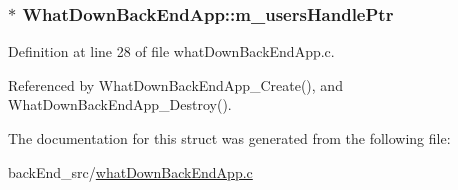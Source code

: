 \subsubsection[{\texorpdfstring{m\+\_\+users\+Handle\+Ptr}{m_usersHandlePtr}}]{$\ast$ What\+Down\+Back\+End\+App\+::m\+\_\+users\+Handle\+Ptr}\hypertarget{structWhatDownBackEndApp_a1bada8187c9d6d2eb1d9d782a0e36970}{}\label{structWhatDownBackEndApp_a1bada8187c9d6d2eb1d9d782a0e36970}


Definition at line 28 of file what\+Down\+Back\+End\+App.\+c.



Referenced by What\+Down\+Back\+End\+App\+\_\+\+Create(), and What\+Down\+Back\+End\+App\+\_\+\+Destroy().



The documentation for this struct was generated from the following file\+:\begin{DoxyCompactItemize}
\item 
back\+End\+\_\+src/\hyperlink{whatDownBackEndApp_8c}{what\+Down\+Back\+End\+App.\+c}\end{DoxyCompactItemize}
